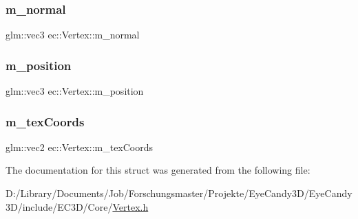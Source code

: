 \subsubsection{\texorpdfstring{m\+\_\+normal}{m\_normal}}
{\footnotesize\ttfamily glm\+::vec3 ec\+::\+Vertex\+::m\+\_\+normal}

\mbox{\label{structec_1_1_vertex_acb3327c996406e4d1a6b43cfa1f3ea47}} 
\subsubsection{\texorpdfstring{m\+\_\+position}{m\_position}}
{\footnotesize\ttfamily glm\+::vec3 ec\+::\+Vertex\+::m\+\_\+position}

\mbox{\label{structec_1_1_vertex_a12e2b45d0fdb3873a01dd9ada9e66f64}} 
\subsubsection{\texorpdfstring{m\+\_\+tex\+Coords}{m\_texCoords}}
{\footnotesize\ttfamily glm\+::vec2 ec\+::\+Vertex\+::m\+\_\+tex\+Coords}



The documentation for this struct was generated from the following file\+:\begin{DoxyCompactItemize}
\item 
D\+:/\+Library/\+Documents/\+Job/\+Forschungsmaster/\+Projekte/\+Eye\+Candy3\+D/\+Eye\+Candy3\+D/include/\+E\+C3\+D/\+Core/\mbox{\hyperlink{_vertex_8h}{Vertex.\+h}}\end{DoxyCompactItemize}
